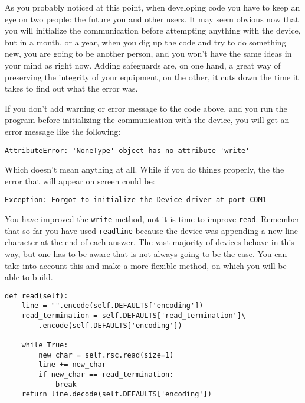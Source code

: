 
As you probably noticed at this point, when developing code you have to
keep an eye on two people: the future you and other users. It may seem
obvious now that you will initialize the communication before attempting
anything with the device, but in a month, or a year, when you dig up the
code and try to do something new, you are going to be another person,
and you won't have the same ideas in your mind as right now. Adding
safeguards are, on one hand, a great way of preserving the integrity of
your equipment, on the other, it cuts down the time it takes to find out
what the error was.

If you don't add warning or error message to the code above, and you run
the program before initializing the communication with the device, you
will get an error message like the following:

\begin{verbatim}
AttributeError: 'NoneType' object has no attribute 'write'
\end{verbatim}

Which doesn't mean anything at all. While if you do things properly, the
the error that will appear on screen could be:

\begin{verbatim}
Exception: Forgot to initialize the Device driver at port COM1
\end{verbatim}

You have improved the \texttt{write} method, not it is time to improve
\texttt{read}. Remember that so far you have used \texttt{readline}
because the device was appending a new line character at the end of each
answer. The vast majority of devices behave in this way, but one has to
be aware that is not always going to be the case. You can take into
account this and make a more flexible method, on which you will be able
to build.

\begin{verbatim}
def read(self):
    line = "".encode(self.DEFAULTS['encoding'])
    read_termination = self.DEFAULTS['read_termination']\
        .encode(self.DEFAULTS['encoding'])
    
    while True:
        new_char = self.rsc.read(size=1)
        line += new_char
        if new_char == read_termination:
            break
    return line.decode(self.DEFAULTS['encoding'])
\end{verbatim}

